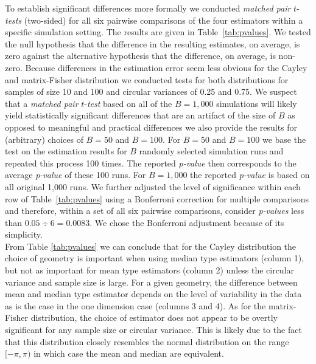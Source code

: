 \documentclass[12pt]{article}
\begin{document}
\noindent To establish significant differences more formally we conducted \textit{matched pair} $t$-\textit{tests} (two-sided) for all six pairwise comparisons of the four estimators within a specific simulation setting.  The results are given in Table~\ref{tab:pvalues}. We tested the null hypothesis that the difference in the resulting estimates, on average, is zero against the alternative hypothesis that the difference, on average, is non-zero.  Because differences in the estimation error seem less obvious for the Cayley and matrix-Fisher distribution we conducted tests for both distributions for samples of size 10 and 100 and circular variances of 0.25 and 0.75. 
We suspect that a \textit{matched pair} $t$-\textit{test} based on all of the $B=1,000$ simulations will likely yield statistically significant differences that are an artifact of the size of $B$ as opposed to meaningful and practical differences we also provide the results for (arbitrary) choices of $B=50$ and $B=100.$ For $B=50$ and $B=100$ we base the test on the estimation results for $B$ randomly selected simulation runs and repeated this process 100 times. The reported \textit{p-value} then corresponds to the average \textit{p-value} of these 100 runs. For $B=1,000$ the reported \textit{p-value} is based on all original 1,000 runs. 
We further adjusted the level of significance within each row of Table~\ref{tab:pvalues} using 
a Bonferroni correction for multiple comparisons and therefore, within a set of all six pairwise comparisons, consider \textit{p-values} less than $0.05\div6=0.0083$.  We chose the Bonferroni adjustment because of its simplicity. \\

\noindent From Table \ref{tab:pvalues} we can conclude that for the Cayley distribution the choice of geometry is important when using median type estimators (column 1), but not as important for mean type estimators (column 2) unless the circular variance and sample size is large.  For a given geometry, the difference between mean and median type estimator depends on the level of variability in the data as is the case in the one dimension case (columns 3 and 4).  As for the matrix-Fisher distribution, the choice of estimator does not appear to be overtly significant for any sample size or circular variance.  This is likely due to the fact that this distribution closely resembles the normal distribution on the range $[-\pi,\pi)$ in which case the mean and median are equivalent.
\end{document}

